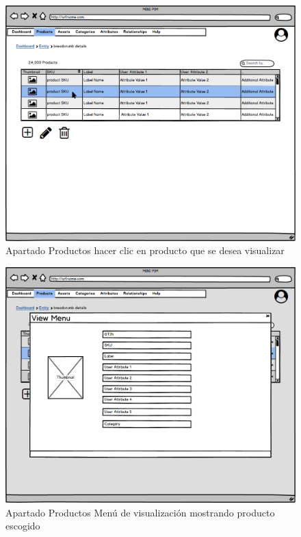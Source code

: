 \begin{figure}[H]
    \includegraphics[width=1\linewidth]{mockups/RF2.X_MostrarProducto(Desde Listado).png}
    \caption{Apartado Productos hacer clic en producto que se desea visualizar}
   \end{figure}
\vspace{1.0cm}
\begin{figure}[H]
    \includegraphics[width=1\linewidth]{mockups/RF2.X_MostrarProducto(Menu visualizacion).png}
    \caption{Apartado Productos Menú de visualización mostrando producto escogido}
   \end{figure}
\vspace{1.0cm}


\newpage %